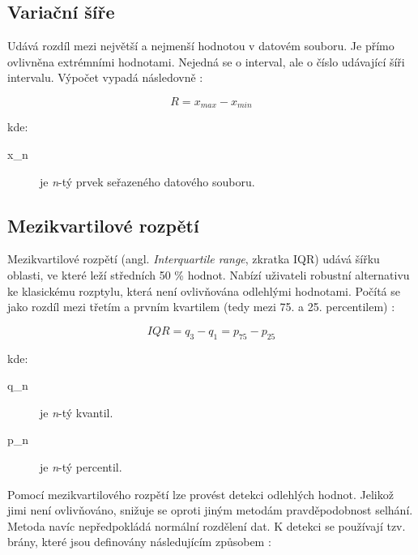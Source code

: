 \subsection*{Variační šíře}

Udává rozdíl mezi největší a nejmenší hodnotou v datovém souboru. Je přímo ovlivněna extrémními hodnotami. Nejedná se o interval, ale o číslo udávající šíři intervalu. Výpočet vypadá následovně \cite{variance}:

\begin{equation}
    R = x_{max} - x_{min}
\end{equation}

\noindent kde:

\begin{description}
    \item[x_n] je \emph{n}-tý prvek seřazeného datového souboru.
\end{description}

\subsection*{Mezikvartilové rozpětí}



Mezikvartilové rozpětí (angl. \emph{Interquartile range}, zkratka IQR) udává šířku oblasti, ve které leží středních 50 \% hodnot. Nabízí uživateli robustní alternativu ke klasickému rozptylu, která není ovlivňována odlehlými hodnotami.  Počítá se jako rozdíl mezi třetím a prvním kvartilem (tedy mezi 75. a 25. percentilem) \cite{frost}:

\begin{equation}
    IQR = q_3 - q_1 = p_{75} - p_{25}
\end{equation}

\noindent kde:

\begin{description}
    \item[q_n] je \emph{n}-tý kvantil.
    \item[p_n] je \emph{n}-tý percentil.
\end{description}



\noindent Pomocí mezikvartilového rozpětí lze provést detekci odlehlých hodnot. Jelikož jimi není ovlivňováno, snižuje se oproti jiným metodám pravděpodobnost selhání. Metoda navíc nepředpokládá normální rozdělení dat. K detekci se používají tzv. brány, které jsou definovány následujícím způsobem \cite{frost2}:

